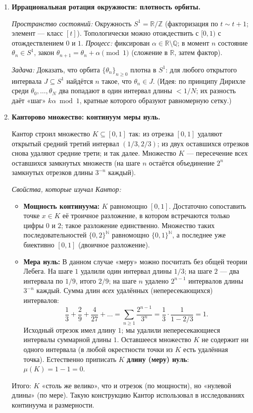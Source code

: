 \documentclass[11pt, a4paper]{extarticle}
\newcommand{\al}{\alpha}
\newcommand{\Z}{{\mathbb Z}}
\newcommand{\R}{{\mathbb R}}
\newcommand{\Q}{{\mathbb Q}}
\newcommand{\N}{{\mathbb N}}
\renewcommand{\ge}{\geqslant}
\begin{document}
\begin{enumerate}[leftmargin=*, label=\textbf{Пример \arabic*.}]
\item \textbf{Иррациональная ротация окружности: плотность орбиты.}

\textit{Пространство состояний:} Окружность $S^1 = \R/\Z$ (факторизация по $t \sim t+1$; элемент --- класс $[t]$). Топологически можно отождествить с $[0,1)$ с отождествлением $0$ и $1$. \textit{Процесс:} фиксирован $\al \in \R \setminus \Q$; в момент $n$ состояние $\theta_n \in S^1$, закон $\theta_{n+1} = \theta_n + \al \pmod 1$ (сложение в $\R$, затем фактор).

\textit{Задача:} Доказать, что орбита $\{\theta_n\}_{n \ge 0}$ плотна в $S^1$: для любого открытого интервала $J \subseteq S^1$ найдётся $n$ такое, что $\theta_n \in J$. (Идея: по принципу Дирихле среди $\theta_0, \ldots, \theta_N$ два попадают в один интервал длины $< 1/N$; их разность даёт «шаг» $k\al \bmod 1$, кратные которого образуют равномерную сетку.)

\item \textbf{Канторово множество: континуум меры нуль.}

Кантор строил множество $K \subseteq [0,1]$ так: из отрезка $[0,1]$ удаляют открытый средний третий интервал $(1/3, 2/3)$; из двух оставшихся отрезков снова удаляют средние трети; и так далее. Множество $K$ --- пересечение всех оставшихся замкнутых множеств (на шаге $n$ остаётся объединение $2^n$ замкнутых отрезков длины $3^{-n}$ каждый).

\textit{Свойства, которые изучал Кантор:}
\begin{itemize}[nosep]
    \item \textbf{Мощность континуума:} $K$ равномощно $[0,1]$. Достаточно сопоставить точке $x \in K$ её троичное разложение, в котором встречаются только цифры $0$ и $2$; такое разложение единственно. Множество таких последовательностей $\{0,2\}^{\N}$ равномощно $\{0,1\}^{\N}$, а последнее уже биективно $[0,1]$ (двоичное разложение).
    \item \textbf{Мера нуль:} В данном случае «меру» можно посчитать без общей теории Лебега. На шаге $1$ удалили один интервал длины $1/3$; на шаге $2$ --- два интервала по $1/9$, итого $2/9$; на шаге $n$ удалено $2^{n-1}$ интервалов длины $3^{-n}$ каждый. Сумма длин \emph{всех} удалённых (непересекающихся) интервалов:
    \[
    \frac{1}{3} + \frac{2}{9} + \frac{4}{27} + \dots = \sum_{n \ge 1} \frac{2^{n-1}}{3^n} = \frac{1}{3} \cdot \frac{1}{1 - 2/3} = 1.
    \]
    Исходный отрезок имел длину $1$; мы удалили непересекающиеся интервалы суммарной длины $1$. Оставшееся множество $K$ не содержит ни одного интервала (в любой окрестности точки из $K$ есть удалённая точка). Естественно приписать $K$ \textbf{длину (меру) нуль}: $\mu(K) = 1 - 1 = 0$.
\end{itemize}
Итого: $K$ «столь же велико», что и отрезок (по мощности), но «нулевой длины» (по мере). Такую конструкцию Кантор использовал в исследованиях континуума и размерности.


\end{enumerate}
\end{document}
